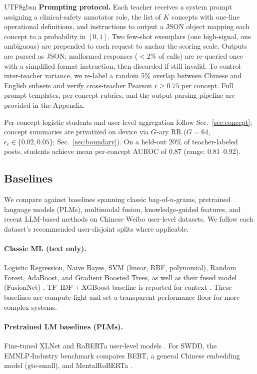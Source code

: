 \documentclass[lettersize,journal]{IEEEtran}
\begin{document}
\begin{CJK*}{UTF8}{gbsn}
\noindent\textbf{Prompting protocol.}
Each teacher receives a system prompt assigning a clinical-safety annotator role, the list of $K$ concepts with one-line operational definitions, and instructions to output a JSON object mapping each concept to a probability in $[0,1]$. Two few-shot exemplars (one high-signal, one ambiguous) are prepended to each request to anchor the scoring scale. Outputs are parsed as JSON; malformed responses ($<$2\% of calls) are re-queried once with a simplified format instruction, then discarded if still invalid. To control inter-teacher variance, we re-label a random 5\% overlap between Chinese and English subsets and verify cross-teacher Pearson $r \ge 0.75$ per concept. Full prompt templates, per-concept rubrics, and the output parsing pipeline are provided in the Appendix.

Per-concept logistic students and user-level aggregation follow Sec.~\ref{sec:concept}; concept summaries are privatized on device via $G$-ary RR ($G{=}64$, $\epsilon_c \in \{0.02,0.05\}$; Sec.~\ref{sec:boundary}). On a held-out 20\% of teacher-labeled posts, students achieve mean per-concept AUROC of 0.87 (range: 0.81--0.92).

\subsection{Baselines}
\label{sec:baselines}
We compare against baselines spanning classic bag-of-$n$-grams, pretrained language models (PLMs), multimodal fusion, knowledge-guided features, and recent LLM-based methods on Chinese Weibo user-level datasets. We follow each dataset's recommended user-disjoint splits where applicable.

\paragraph{Classic ML (text only).}
Logistic Regression, Naive Bayes, SVM (linear, RBF, polynomial), Random Forest, AdaBoost, and Gradient Boosted Trees, as well as their fused model (FusionNet) \cite{Wang2022INS_WU3D}. TF–IDF\,\,+\,XGBoost baseline is reported for context \cite{Lan2025EMNLP}. These baselines are compute‑light and set a transparent performance floor for more complex systems.

\paragraph{Pretrained LM baselines (PLMs).}
Fine‑tuned XLNet and RoBERTa user‑level models \cite{Zhu2021WU3D_Baseline}. For SWDD, the EMNLP‑Industry benchmark compares BERT, a general Chinese embedding model (gte‑small), and MentalRoBERTa \cite{Lan2025EMNLP}.


\end{CJK*}
\end{document}
